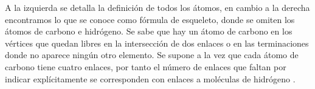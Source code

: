 A la izquierda se detalla la definición de todos los átomos, en cambio a la derecha encontramos lo que se conoce como fórmula de esqueleto, donde se omiten los átomos de carbono e hidrógeno. Se sabe que hay un átomo de carbono en los vértices que quedan libres en la intersección de dos enlaces o en las terminaciones donde no aparece ningún otro elemento. Se supone a la vez que cada átomo de carbono tiene cuatro enlaces, por tanto el número de enlaces que faltan por indicar explícitamente se corresponden con enlaces a moléculas de hidrógeno \cite{formestructural,structrep}.

